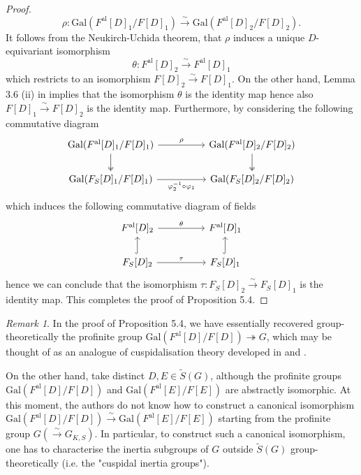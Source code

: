 \documentclass{article}
\theoremstyle{plain}
\theoremstyle{definition}
\theoremstyle{remark}
\newtheorem{rem}[thm]{Remark}
\begin{document}
\begin{proof}
$$
\rho: \text{Gal}(F^{\text{al}}[D]_1/F[D]_1) \xrightarrow{\sim} \text{Gal}(F^{\text{al}}[D]_2/F[D]_2).
$$
It follows from the Neukirch-Uchida theorem, that $\rho$ induces a unique $D$-equivariant isomorphism
$$
\theta: F^{\text{al}}[D]_2 \xrightarrow{\sim} F^{\text{al}}[D]_1
$$
which restricts to an isomorphism $F[D]_2 \xrightarrow{\sim} F[D]_1$. On the other hand, Lemma 3.6 (ii) in \cite{Ho2} implies that the isomorphism $\theta$ is the identity map hence also $F[D]_1 \xrightarrow{\sim} F[D]_2$ is the identity map. Furthermore, by considering the following commutative diagram
$$
\begin{tikzcd}
	{\text{Gal}(F^{\text{al}}[D]_1/F[D]_1)} && {\text{Gal}(F^{\text{al}}[D]_2/F[D]_2)} \\
	{\text{Gal}(F_S[D]_1/F[D]_1)} && {\text{Gal}(F_S[D]_2/F[D]_2)}
	\arrow["\rho", from=1-1, to=1-3]
	\arrow[two heads, from=1-1, to=2-1]
	\arrow[two heads, from=1-3, to=2-3]
	\arrow["{\varphi_2^{-1}\circ\varphi_1}"', from=2-1, to=2-3]
\end{tikzcd}
$$
which induces the following commutative diagram of fields
$$    
\begin{tikzcd}
	{F^{\text{al}}[D]_2} && {F^{\text{al}}[D]_1} \\
	{F_S[D]_2} && {F_S[D]_1}
	\arrow["\theta", from=1-1, to=1-3]
	\arrow[hook, from=2-1, to=1-1]
	\arrow["\tau", from=2-1, to=2-3]
	\arrow[hook, from=2-3, to=1-3]
\end{tikzcd}
$$
hence we can conclude that the isomorphism $\tau: F_S[D]_2 \xrightarrow{\sim} F_S[D]_1$ is the identity map. This completes the proof of Proposition 5.4.
\end{proof}
\begin{rem}
In the proof of Proposition 5.4, we have essentially recovered group-theoretically the profinite group $\text{Gal}(F^{\text{al}}[D]/F[D]) \twoheadrightarrow G$, which may be thought of as an analogue of cuspidalisation theory developed in \cite{Mzk2} and \cite{Mzk4}. \par 
On the other hand, take distinct $D,E \in \widetilde{S}(G)$, although the profinite groups $\text{Gal}(F^{\text{al}}[D]/F[D])$ and $\text{Gal}(F^{\text{al}}[E]/F[E])$ are abstractly isomorphic. At this moment, the authors do not know how to construct a canonical isomorphism $\text{Gal}(F^{\text{al}}[D]/F[D]) \xrightarrow{\sim} \text{Gal}(F^{\text{al}}[E]/F[E])$ starting from the profinite group $G (\xrightarrow{\sim} G_{K,S})$. In particular, to construct such a canonical isomorphism, one has to characterise the inertia subgroups of $G$ outside $\widetilde{S}(G)$ group-theoretically (i.e. the "cuspidal inertia groups"). 
\end{rem}
\end{document}
